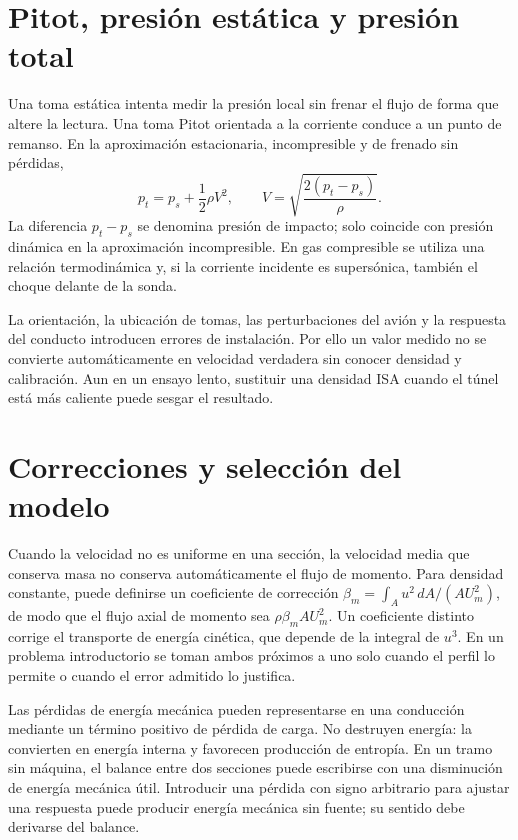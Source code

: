 \section{Pitot, presión estática y presión total}
Una toma estática intenta medir la presión local sin frenar el flujo de forma que altere la lectura. Una toma Pitot orientada a la corriente conduce a un punto de remanso. En la aproximación estacionaria, incompresible y de frenado sin pérdidas,
\begin{equation}
 p_t=p_s+\frac12\rho V^2,\qquad
 V=\sqrt{\frac{2(p_t-p_s)}{\rho}}.
\end{equation}
La diferencia $p_t-p_s$ se denomina presión de impacto; solo coincide con presión dinámica en la aproximación incompresible. En gas compresible se utiliza una relación termodinámica y, si la corriente incidente es supersónica, también el choque delante de la sonda.

La orientación, la ubicación de tomas, las perturbaciones del avión y la respuesta del conducto introducen errores de instalación. Por ello un valor medido no se convierte automáticamente en velocidad verdadera sin conocer densidad y calibración. Aun en un ensayo lento, sustituir una densidad ISA cuando el túnel está más caliente puede sesgar el resultado.


\section{Correcciones y selección del modelo}
Cuando la velocidad no es uniforme en una sección, la velocidad media que conserva masa no conserva automáticamente el flujo de momento. Para densidad constante, puede definirse un coeficiente de corrección $\beta_m=\int_Au^2\,dA/(AU_m^2)$, de modo que el flujo axial de momento sea $\rho\beta_m AU_m^2$. Un coeficiente distinto corrige el transporte de energía cinética, que depende de la integral de $u^3$. En un problema introductorio se toman ambos próximos a uno solo cuando el perfil lo permite o cuando el error admitido lo justifica.

Las pérdidas de energía mecánica pueden representarse en una conducción mediante un término positivo de pérdida de carga. No destruyen energía: la convierten en energía interna y favorecen producción de entropía. En un tramo sin máquina, el balance entre dos secciones puede escribirse con una disminución de energía mecánica útil. Introducir una pérdida con signo arbitrario para ajustar una respuesta puede producir energía mecánica sin fuente; su sentido debe derivarse del balance.

